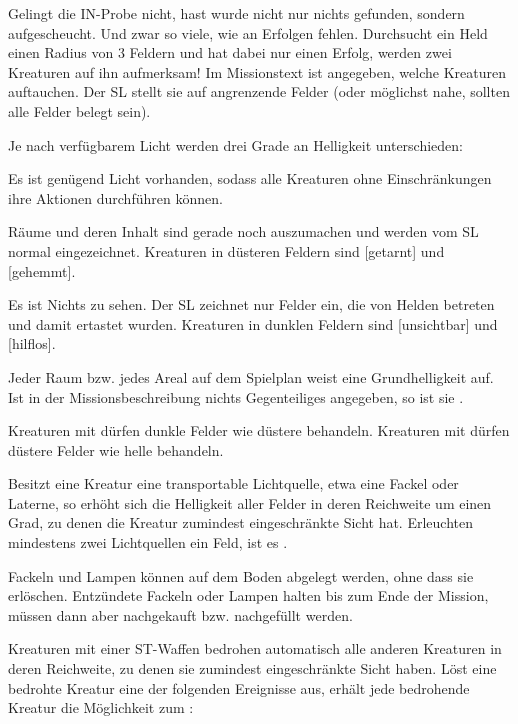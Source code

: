 {			Gelingt die IN-Probe nicht, hast wurde nicht nur nichts gefunden, sondern  aufgescheucht. Und zwar so viele, wie an Erfolgen fehlen. Durchsucht ein Held einen Radius von 3 Feldern und hat dabei nur einen Erfolg, werden zwei Kreaturen auf ihn aufmerksam! Im Missionstext ist angegeben, welche Kreaturen auftauchen. Der SL stellt sie auf angrenzende Felder (oder möglichst nahe, sollten alle Felder belegt sein).

		Je nach verfügbarem Licht werden drei Grade an Helligkeit unterschieden:

		 Es ist genügend Licht vorhanden, sodass alle Kreaturen ohne Einschränkungen ihre Aktionen durchführen können.

		 Räume und deren Inhalt sind gerade noch auszumachen und werden vom SL normal eingezeichnet. Kreaturen in düsteren Feldern sind [getarnt] und [gehemmt].

		 Es ist Nichts zu sehen. Der SL zeichnet nur Felder ein, die von Helden betreten und damit ertastet wurden. Kreaturen in dunklen Feldern sind [unsichtbar] und [hilflos].

		Jeder Raum bzw. jedes Areal auf dem Spielplan weist eine Grundhelligkeit auf. Ist in der Missionsbeschreibung nichts Gegenteiliges angegeben, so ist sie .

		Kreaturen mit  dürfen dunkle Felder wie düstere behandeln. Kreaturen mit  dürfen düstere Felder wie helle behandeln.

			Besitzt eine Kreatur eine transportable Lichtquelle, etwa eine Fackel oder Laterne, so erhöht sich die Helligkeit aller Felder in deren Reichweite um einen Grad, zu denen die Kreatur zumindest eingeschränkte Sicht hat. Erleuchten mindestens zwei Lichtquellen ein Feld, ist es .

			Fackeln und Lampen können auf dem Boden abgelegt werden, ohne dass sie erlöschen. Entzündete Fackeln oder Lampen halten bis zum Ende der Mission, müssen dann aber nachgekauft bzw. nachgefüllt werden.

		Kreaturen mit einer ST-Waffen bedrohen automatisch alle anderen Kreaturen in deren Reichweite, zu denen sie zumindest eingeschränkte Sicht haben. Löst eine bedrohte Kreatur eine der folgenden Ereignisse aus, erhält jede bedrohende Kreatur die Möglichkeit zum :

}
